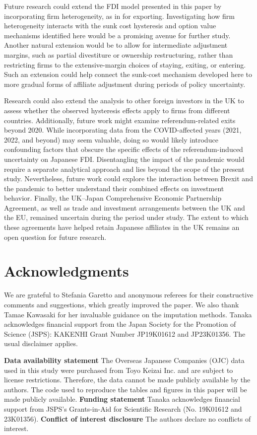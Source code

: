 \documentclass[preprint,11pt,authoryear]{elsarticle}
\begin{document}
Future research could extend the FDI model presented in this paper by incorporating firm heterogeneity, as in \citet{graziano2021brexit} for exporting. Investigating how firm heterogeneity interacts with the sunk cost hysteresis and option value mechanisms identified here would be a promising avenue for further study.
Another natural extension would be to allow for intermediate adjustment margins, such as partial divestiture or ownership restructuring, rather than restricting firms to the extensive-margin choices of staying, exiting, or entering. Such an extension could help connect the sunk-cost mechanism developed here to more gradual forms of affiliate adjustment during periods of policy uncertainty.

Research could also extend the analysis to other foreign investors in the UK to assess whether the observed hysteresis effects apply to firms from different countries. Additionally, future work might examine referendum-related exits beyond 2020. While incorporating data from the COVID-affected years (2021, 2022, and beyond) may seem valuable, doing so would likely introduce confounding factors that obscure the specific effects of the referendum-induced uncertainty on Japanese FDI. Disentangling the impact of the pandemic would require a separate analytical approach and lies beyond the scope of the present study. Nevertheless, future work could explore the interaction between Brexit and the pandemic to better understand their combined effects on investment behavior.
Finally, the UK–Japan Comprehensive Economic Partnership Agreement, as well as trade and investment arrangements between the UK and the EU, remained uncertain during the period under study. The extent to which these agreements have helped retain Japanese affiliates in the UK remains an open question for future research.

\section*{Acknowledgments}
\noindent We are grateful to Stefania Garetto and anonymous referees for their constructive comments and suggestions, which greatly improved the paper.
We also thank Tamae Kawasaki for her invaluable guidance on the imputation methods.
Tanaka acknowledges financial support from the Japan Society for the Promotion of Science (JSPS): KAKENHI Grant Number JP19K01612 and JP23K01356. The usual disclaimer applies.

\vspace{0.5cm}
\noindent
\textbf{Data availability statement}
The Overseas Japanese Companies (OJC) data used in this study were purchased from Toyo Keizai Inc. and are subject to license restrictions. Therefore, the data cannot be made publicly available by the authors. The code used to reproduce the tables and figures in this paper will be made publicly available.
\newline
\textbf{Funding statement}
Tanaka acknowledges financial support from JSPS's Grants-in-Aid for Scientific Research (No. 19K01612 and 23K01356).
\newline
\textbf{Conflict of interest disclosure}
The authors declare no conflicts of interest.
\end{document}
